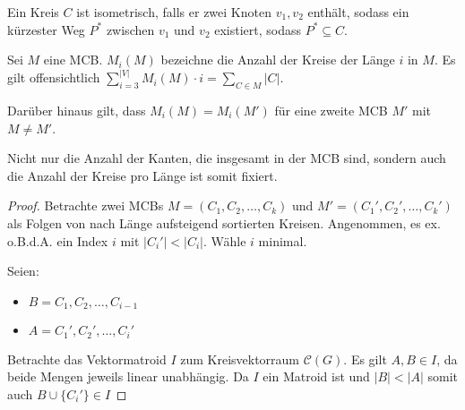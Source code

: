 \begin{definition}[Isometrie]
    Ein Kreis $ C $ ist isometrisch, falls er zwei Knoten $ v_1, v_2 $ enthält, sodass ein kürzester Weg $ P^* $ zwischen $ v_1 $ und $ v_2 $ existiert, sodass $ P^* \subseteq C $.
\end{definition}

\begin{lemma}
    Sei $ M $ eine MCB.
    $ M_i(M) $ bezeichne die Anzahl der Kreise der Länge $ i $ in $ M $.
    Es gilt offensichtlich $ \sum^{|V|}_{i = 3} M_i(M) \cdot i = \sum_{C \in M} |C| $.

    Darüber hinaus gilt, dass $ M_i(M) = M_i(M') $ für eine zweite MCB $ M' $ mit $ M \ne M' $.
\end{lemma}

\begin{remark}
    Nicht nur die Anzahl der Kanten, die insgesamt in der MCB sind, sondern auch die Anzahl der Kreise pro Länge ist somit fixiert.
\end{remark}

\begin{proof}
    Betrachte zwei MCBs $ M = (C_1, C_2, \dots, C_k) $ und $ M' = (C_1', C_2', \dots, C_k') $ als Folgen von nach Länge aufsteigend sortierten Kreisen.
    Angenommen, es ex. o.B.d.A. ein Index $ i $ mit $ |C_i'|<|C_i| $.
    Wähle $ i $ minimal.

    Seien:
    \begin{itemize}
        \item $ B = { C_1, C_2, \dots, C_{i - 1} } $
        \item $ A = { C_1', C_2', \dots, C_i' } $
    \end{itemize}

    Betrachte das Vektormatroid $ I $ zum Kreisvektorraum $ \mathcal{C}(G) $.
    Es gilt $ A, B \in I $, da beide Mengen jeweils linear unabhängig.
    Da $ I $ ein Matroid ist und $ |B| < |A| $ somit auch $ B \cup \{ C_i' \} \in I $
\end{proof}
